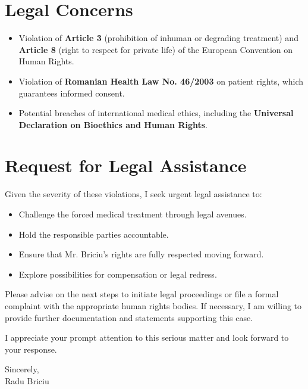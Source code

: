 \documentclass[11pt,letterpaper]{article}
\begin{document}
	\section*{Legal Concerns}
	\begin{itemize}
		\item Violation of \textbf{Article 3} (prohibition of inhuman or degrading treatment) and \textbf{Article 8} (right to respect for private life) of the European Convention on Human Rights.
		\item Violation of \textbf{Romanian Health Law No. 46/2003} on patient rights, which guarantees informed consent.
		\item Potential breaches of international medical ethics, including the \textbf{Universal Declaration on Bioethics and Human Rights}.
	\end{itemize}
	
	\section*{Request for Legal Assistance}
	Given the severity of these violations, I seek urgent legal assistance to:
	\begin{itemize}
		\item Challenge the forced medical treatment through legal avenues.
		\item Hold the responsible parties accountable.
		\item Ensure that Mr. Briciu's rights are fully respected moving forward.
		\item Explore possibilities for compensation or legal redress.
	\end{itemize}
	
	Please advise on the next steps to initiate legal proceedings or file a formal complaint with the appropriate human rights bodies. If necessary, I am willing to provide further documentation and statements supporting this case.
	
	I appreciate your prompt attention to this serious matter and look forward to your response.
	
	\vspace{1cm}
	
	Sincerely,  \\
	Radu Briciu
	
\end{document}
